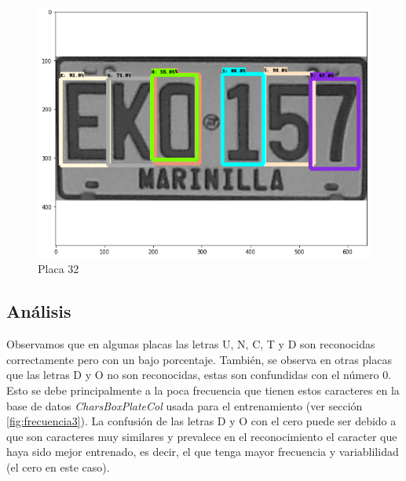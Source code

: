 
\begin{figure}[H]
\centering
\includegraphics[width=0.4\linewidth]{imagenes/caracteres detectados/nuevo entrenamiento/24.png}
\caption{Placa 32}
\label{fig:caracteres detectados p25}
\end{figure}

\begin{table}[H]
    \centering
    \caption{Detección de caracteres con porcentajes de acierto placa 32}
    \label{tab:25}
\end{table}

\subsection*{Análisis}

Observamos que en algunas placas las letras U, N, C, T y D son reconocidas correctamente pero con un bajo porcentaje.  También, se observa en otras placas que las letras D y O no son reconocidas, estas son confundidas con el número 0. Esto se debe principalmente a la poca frecuencia que tienen estos caracteres en la base de datos \textit{CharsBoxPlateCol} usada para el entrenamiento (ver sección \ref{fig:frecuencia3}). La confusión de las letras D y O con el cero puede ser debido a que son caracteres muy similares y prevalece en el reconocimiento el caracter que haya sido mejor entrenado, es decir, el que tenga mayor frecuencia y variablilidad (el cero en este caso).

